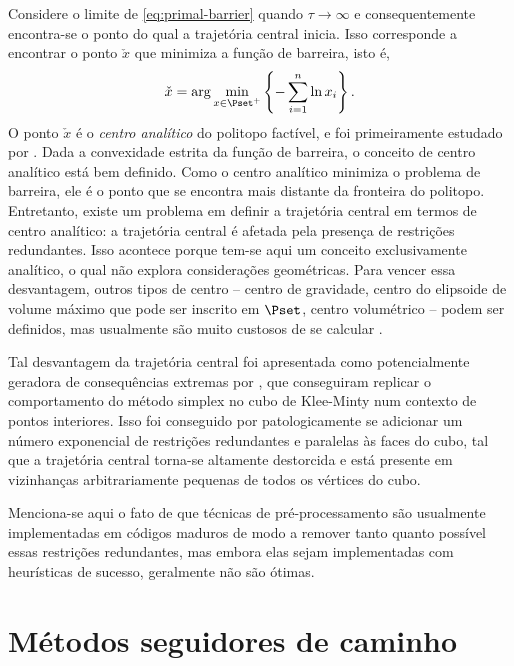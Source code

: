 Considere o limite de \eqref{eq:primal-barrier} quando $\tau\to \infty$ e
consequentemente encontra-se o ponto do qual a trajetória central inicia. Isso
corresponde a encontrar o ponto $\check{x}$ que minimiza a função de barreira,
isto é, 
\[
\check{x} = \arg \min_{x\in\Pset^+}\left\{-\sum_{i=1}^{n}\ln x_i \right\}.
\]
O ponto $\check{x}$ é o \emph{centro analítico} do politopo factível, e foi
primeiramente estudado por \citet{Sonnevend:1986ua}. Dada a convexidade estrita
da função de barreira, o conceito de centro analítico está bem definido. Como o
centro analítico minimiza o problema de barreira, ele é o ponto que se encontra
mais distante da fronteira do politopo. Entretanto, existe um problema em
definir a trajetória central em termos de centro analítico: a trajetória central
é afetada pela presença de restrições redundantes. Isso acontece porque tem-se
aqui um conceito exclusivamente analítico, o qual não explora considerações
geométricas. Para vencer essa desvantagem, outros tipos de centro -- centro de
gravidade, centro do elipsoide de volume máximo que pode ser inscrito em
$\Pset$, centro volumétrico  -- podem ser definidos, mas usualmente são muito
custosos de se calcular \cite{Gonzaga:1992uj}.


Tal desvantagem da trajetória central foi  apresentada como potencialmente
geradora de consequências extremas por \citet{Deza:2006hm}, que conseguiram
replicar o comportamento do método simplex no cubo de Klee-Minty num contexto de
pontos interiores. Isso foi conseguido por patologicamente se adicionar um
número exponencial de restrições redundantes e paralelas às faces do cubo, tal que a trajetória
central torna-se altamente destorcida e está presente em vizinhanças
arbitrariamente pequenas de todos os vértices do cubo. 

Menciona-se aqui o fato de que técnicas de pré-processamento são usualmente
implementadas em códigos maduros de modo a remover tanto quanto possível essas
restrições redundantes, mas embora elas sejam implementadas com heurísticas de
sucesso, geralmente não são ótimas.







 
\section{Métodos seguidores de caminho\label{sec:path-following-methods}}



